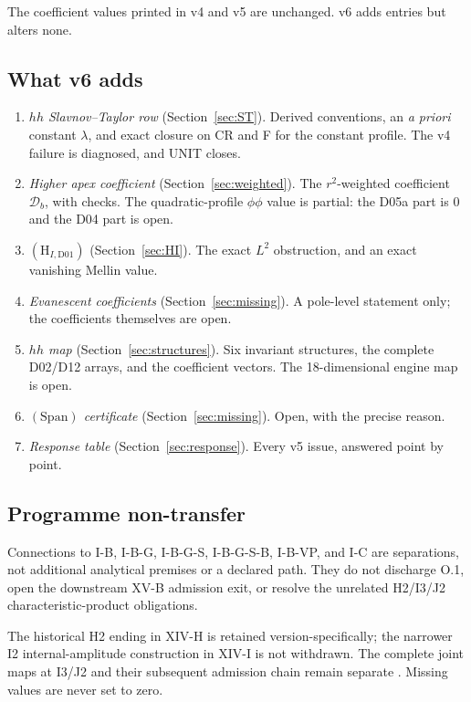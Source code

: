 \documentclass[11pt,a4paper]{article}
\newcommand{\Span}{(\mathrm{Span})}
\theoremstyle{plain}
\theoremstyle{definition}
\theoremstyle{remark}
\numberwithin{equation}{section}
\begin{document}
The coefficient values printed in v4 and v5 are unchanged.
v6 adds entries but alters none.

\subsection{What v6 adds}

\begin{enumerate}[label=\textup{(\alph*)}]
\item \emph{\(hh\) Slavnov--Taylor row}
(Section~\ref{sec:ST}).
Derived conventions, an \emph{a priori} constant \(\lambda\), and
exact closure on CR and F for the constant profile.
The v4 failure is diagnosed, and UNIT closes.
\item \emph{Higher apex coefficient}
(Section~\ref{sec:weighted}).
The \(r^2\)-weighted coefficient \(\mathcal D_b\), with checks.
The quadratic-profile \(\phi\phi\) value is partial: the D05a part
is \(0\) and the D04 part is open.
\item \emph{\((\mathrm H_{I,\mathrm{D01}})\)}
(Section~\ref{sec:HI}).
The exact \(L^2\) obstruction, and an exact vanishing Mellin value.
\item \emph{Evanescent coefficients}
(Section~\ref{sec:missing}).
A pole-level statement only; the coefficients themselves are open.
\item \emph{\(hh\) map}
(Section~\ref{sec:structures}).
Six invariant structures, the complete D02/D12 arrays, and the
coefficient vectors.
The 18-dimensional engine map is open.
\item \emph{\(\Span\) certificate}
(Section~\ref{sec:missing}).
Open, with the precise reason.
\item \emph{Response table}
(Section~\ref{sec:response}).
Every v5 issue, answered point by point.
\end{enumerate}

\subsection{Programme non-transfer}

Connections to I-B, I-B-G, I-B-G-S, I-B-G-S-B, I-B-VP, and I-C are
separations, not additional analytical premises or a declared path.
They do not discharge O.1, open the downstream XV-B admission exit,
or resolve the unrelated H2/I3/J2 characteristic-product obligations.

The historical H2 ending in XIV-H is retained version-specifically;
the narrower I2 internal-amplitude construction in XIV-I is not
withdrawn. The complete joint maps at I3/J2 and their subsequent
admission chain remain separate
\cite{CheungCharacteristic,CheungXVB}.
Missing values are never set to zero.
\end{document}
